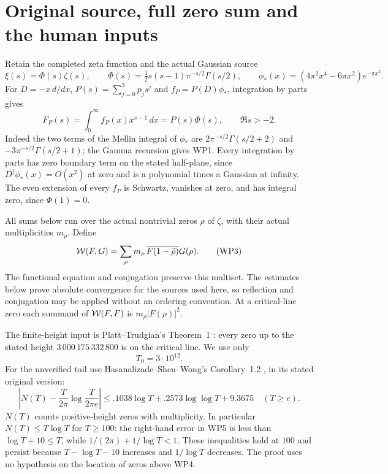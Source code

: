 \section{Original source, full zero sum and the human inputs}
Retain the completed zeta function and the actual Gaussian source
\[
 \xi(s)=\Phi(s)\zeta(s),\qquad
 \Phi(s)=\tfrac12s(s-1)\pi^{-s/2}\Gamma(s/2),\qquad
 \phi_*(x)=(4\pi^2x^4-6\pi x^2)e^{-\pi x^2}.                 \tag{WP1}
\]
For $D=-x\,d/dx$, $P(s)=\sum_{j=0}^3p_js^j$ and
$f_P=P(D)\phi_*$, integration by parts gives
\[
 F_P(s)=\int_0^\infty f_P(x)x^{s-1}\,dx=P(s)\Phi(s),
                  \qquad \Re s>-2.                            \tag{WP2}
\]
Indeed the two terms of the Mellin integral of $\phi_*$ are
$2\pi^{-s/2}\Gamma(s/2+2)$ and
$-3\pi^{-s/2}\Gamma(s/2+1)$; the Gamma recursion gives WP1.
Every integration by parts has zero boundary term on the stated
half-plane, since $D^j\phi_*(x)=O(x^2)$ at zero and is a polynomial
times a Gaussian at infinity. The even extension of every $f_P$ is
Schwartz, vanishes at zero, and has integral zero, since $\Phi(1)=0$.

All sums below run over the actual nontrivial zeros $\rho$ of $\zeta$,
with their actual multiplicities $m_\rho$. Define
\[
 \mathcal W(F,G)=\sum_\rho m_\rho\,
       \overline{F(1-\bar\rho)}G(\rho).                         \tag{WP3}
\]
The functional equation and conjugation preserve this multiset.
The estimates below prove absolute convergence for the sources
used here, so reflection and conjugation may be applied without
an ordering convention. At a critical-line zero each summand of
$\mathcal W(F,F)$ is $m_\rho|F(\rho)|^2$.

The finite-height input is Platt--Trudgian's Theorem~1
\cite{swcert:PlattTrudgian}: every zero up to the stated height
$3\,000\,175\,332\,800$ is on the critical line. We use only
\[
                         T_0=3\cdot10^{12}.                    \tag{WP4}
\]
For the unverified tail use Hasanalizade--Shen--Wong's
Corollary~1.2 \cite{swcert:HSW}, in its stated original version:
\[
 \left|N(T)-\frac{T}{2\pi}\log\frac{T}{2\pi e}\right|
 \le .1038\log T+.2573\log\log T+9.3675\quad(T\ge e).          \tag{WP5}
\]
$N(T)$ counts positive-height zeros with multiplicity. In particular
$N(T)\le T\log T$ for $T\ge100$: the right-hand error in WP5 is
less than $\log T+10\le T$, while
$1/(2\pi)+1/\log T<1$. These inequalities hold at $100$ and
persist because $T-\log T-10$ increases and $1/\log T$ decreases.
The proof uses no hypothesis on the location of zeros above WP4.

